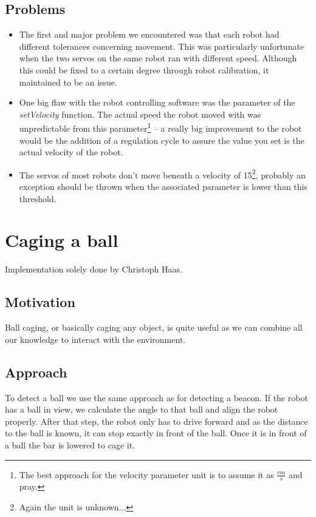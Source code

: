 \documentclass[703031]{iisreport}
\begin{document}
\subsection{Problems}
\label{subsec:motion_problems}
	\begin{itemize}
		\item 	The first and major problem we encountered was that each robot had different tolerances concerning movement. This was particularly unfortunate when the two servos on 
			the same robot ran with different speed. Although this could be fixed to a certain degree through robot calibration, it maintained to be an issue.
		\item	One big flaw with the robot controlling software was the parameter of the \emph{setVelocity} function. The actual speed the robot moved with was unpredictable from
			this parameter\footnote{The best approach for the velocity parameter unit is to assume it as $\frac{cm}{s}$ and pray.} -- a really big improvement to the robot would be the
			addition of a regulation cycle to assure the value you set is the actual velocity of the robot.
		\item 	The servos of most robots don't move beneath a velocity of 15\footnote{Again the unit is unknown...}, probably an exception should be thrown when the associated parameter is lower than this threshold.
	\end{itemize}


\section{Caging a ball}
\label{sec:caging}
Implementation solely done by Christoph Haas.

\subsection{Motivation}
Ball caging, or basically caging any object, is quite useful as we can combine all our knowledge to interact with the environment.

\subsection{Approach}
To detect a ball we use the same approach as for detecting a beacon. If the robot has a ball in view,
we calculate the angle to that ball and align the robot properly. After that step, the robot only has to drive forward and as the distance to the ball is known, it can stop exactly in front of the ball. Once it is in front of a ball the bar is lowered to cage it.
\end{document}
